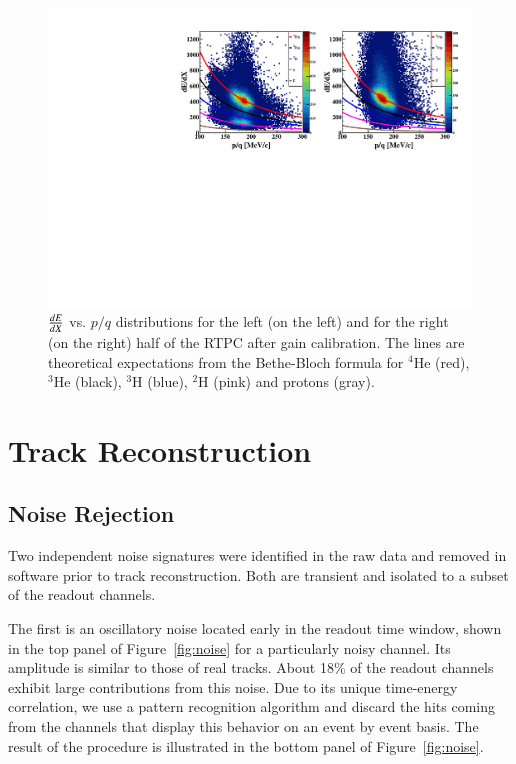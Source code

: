 \documentclass[preprint,5p]{elsarticle}
\begin{document}
\begin{figure}[!h]
\centering
\includegraphics[scale=0.73]{f_dedx_p_exp_2nd.pdf}
\caption{$\small{\frac{dE}{dX}}$ vs. $p/q$ distributions for the left (on the 
   left) and for the right (on the right) half of the RTPC after gain 
   calibration. The lines are theoretical expectations from the Bethe-Bloch 
   formula for $^4$He 
   (red), $^3$He (black), $^3$H (blue), $^2$H (pink) and protons (gray).}
\label{fig:dedx_p_exp_2nd}
\end{figure}

\section{Track Reconstruction}
\label{sec_tracking}

\subsection{Noise Rejection}
Two independent noise signatures were identified in the raw data and removed 
in software prior to track reconstruction. Both are transient and isolated to 
a subset of the readout channels. 

The first is an oscillatory noise located early in the readout time window, 
shown in the top panel of Figure~\ref{fig:noise} for a particularly noisy 
channel. Its amplitude is similar to those of real tracks. About 18\% of the 
readout channels exhibit large contributions from this noise.  Due to its 
unique time-energy correlation, we use a pattern recognition algorithm and 
discard the hits coming from the channels that display this behavior on an 
event by event basis. The result of the procedure is illustrated in the bottom 
panel of Figure~\ref{fig:noise}.
\end{document}
